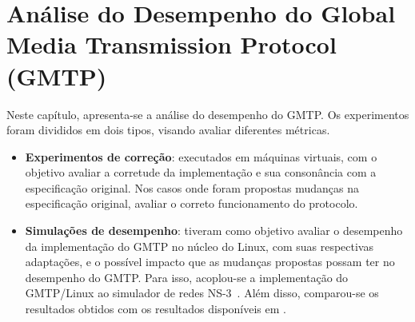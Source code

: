 \chapter{Análise do Desempenho do Global Media Transmission Protocol (GMTP)}
\label{cap:desempenho}

Neste capítulo, apresenta-se a análise do desempenho do GMTP. 
Os experimentos foram divididos em dois tipos, visando avaliar diferentes métricas.

\begin{itemize}
\item \textbf{Experimentos de correção}: executados em máquinas virtuais, com o objetivo avaliar a corretude da implementação e sua consonância com a especificação original.
Nos casos onde foram propostas mudanças na especificação original, avaliar o correto funcionamento do protocolo. 

\item \textbf{Simulações de desempenho}: tiveram como objetivo avaliar o desempenho da implementação do GMTP no núcleo do Linux, com suas respectivas adaptações, e o possível impacto que as mudanças propostas possam ter no desempenho do GMTP.
Para isso, acoplou-se a implementação do GMTP/Linux ao simulador de redes NS-3~\cite{henderson2008network}. Além disso, comparou-se os resultados obtidos com os resultados disponíveis em \cite{sales2014gmtp}.

\end{itemize} 


% 
% 
% 
% 






